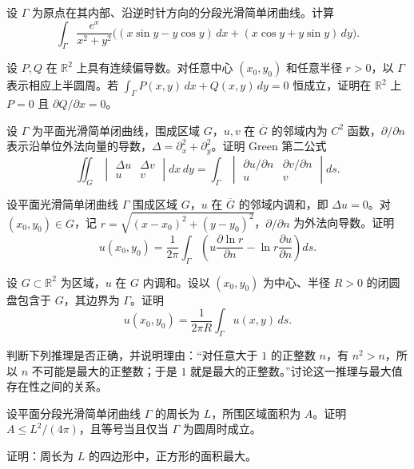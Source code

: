 \noindent\begin{minipage}{\textwidth}
设 $\Gamma$ 为原点在其内部、沿逆时针方向的分段光滑简单闭曲线。计算\[\int_\Gamma\frac{e^x}{x^2+y^2}\bigl((x\sin y-y\cos y)\,dx+(x\cos y+y\sin y)\,dy\bigr).\]
\end{minipage}\par\vfill
\noindent\begin{minipage}{\textwidth}
设 $P,Q$ 在 $\mathbb R^2$ 上具有连续偏导数。对任意中心 $(x_0,y_0)$ 和任意半径 $r>0$，以 $\Gamma$ 表示相应上半圆周。若 $\int_\Gamma P(x,y)\,dx+Q(x,y)\,dy=0$ 恒成立，证明在 $\mathbb R^2$ 上 $P=0$ 且 $\partial Q/\partial x=0$。
\end{minipage}\par\vfill
\newpage
\noindent\begin{minipage}{\textwidth}
设 $\Gamma$ 为平面光滑简单闭曲线，围成区域 $G$，$u,v$ 在 $\overline G$ 的邻域内为 $C^2$ 函数，$\partial/\partial n$ 表示沿单位外法向量的导数，$\Delta=\partial_x^2+\partial_y^2$。证明 Green 第二公式\[\iint_G\begin{vmatrix}\Delta u&\Delta v\\u&v\end{vmatrix}dx\,dy=\int_\Gamma\begin{vmatrix}\partial u/\partial n&\partial v/\partial n\\u&v\end{vmatrix}ds.\]
\end{minipage}\par\vfill
\noindent\begin{minipage}{\textwidth}
设平面光滑简单闭曲线 $\Gamma$ 围成区域 $G$，$u$ 在 $\overline G$ 的邻域内调和，即 $\Delta u=0$。对 $(x_0,y_0)\in G$，记 $r=\sqrt{(x-x_0)^2+(y-y_0)^2}$，$\partial/\partial n$ 为外法向导数。证明\[u(x_0,y_0)=\frac1{2\pi}\int_\Gamma\left(u\frac{\partial\ln r}{\partial n}-\ln r\frac{\partial u}{\partial n}\right)ds.\]
\end{minipage}\par\vfill
\noindent\begin{minipage}{\textwidth}
设 $G\subset\mathbb R^2$ 为区域，$u$ 在 $G$ 内调和。设以 $(x_0,y_0)$ 为中心、半径 $R>0$ 的闭圆盘包含于 $G$，其边界为 $\Gamma$。证明\[u(x_0,y_0)=\frac1{2\pi R}\int_\Gamma u(x,y)\,ds.\]
\end{minipage}\par\vfill
\newpage
\noindent\begin{minipage}{\textwidth}
判断下列推理是否正确，并说明理由：“对任意大于 $1$ 的正整数 $n$，有 $n^2>n$，所以 $n$ 不可能是最大的正整数；于是 $1$ 就是最大的正整数。”讨论这一推理与最大值存在性之间的关系。
\end{minipage}\par\vfill
\noindent\begin{minipage}{\textwidth}
设平面分段光滑简单闭曲线 $\Gamma$ 的周长为 $L$，所围区域面积为 $A$。证明 $A\le L^2/(4\pi)$，且等号当且仅当 $\Gamma$ 为圆周时成立。
\end{minipage}\par\vfill
\noindent\begin{minipage}{\textwidth}
证明：周长为 $L$ 的四边形中，正方形的面积最大。
\end{minipage}\par\vfill
